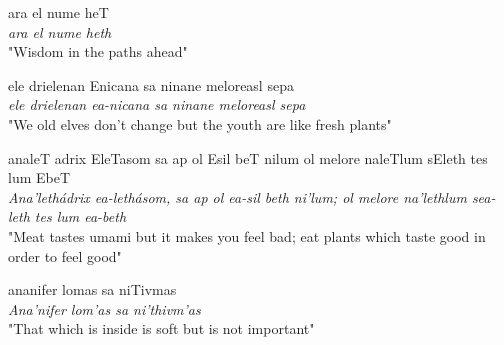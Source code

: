 \documentclass{minimal}
\begin{document}
\centering 
{\fontsize{35pt}{10pt} \tovian 
ara el nume heT
}\\
\textit{ara el nume heth\\}
"Wisdom in the paths ahead"

\vspace{1in}

{\fontsize{35pt}{10pt} \tovian 
ele drielenan Enicana sa ninane meloreasl sepa 
}\\
\textit{ele drielenan ea-nicana sa ninane meloreasl sepa\\}
"We old elves don't change but the youth are like fresh plants" \\
\vspace{1in}


{\fontsize{35pt}{10pt} \tovian 
analeT adrix EleTasom sa ap ol Esil beT nilum ol melore naleTlum sEleth tes lum EbeT 
}\\
\textit{Ana'lethádrix ea-lethásom, sa ap ol ea-sil beth ni'lum; ol melore na'lethlum sea-leth tes lum ea-beth}\\
"Meat tastes umami but it makes you feel bad; eat plants which taste good in order to feel good"
\vspace{1in}



{\fontsize{35pt}{10pt} \tovian 
ananifer lomas sa niTivmas
}\\
\textit{Ana'nifer lom'as sa ni'thivm'as}\\
"That which is inside is soft but is not important"\\
\vspace{1in}





{\fontsize{35pt}{10pt} \tovian 

}\\
\vspace{1in}
\end{document}
